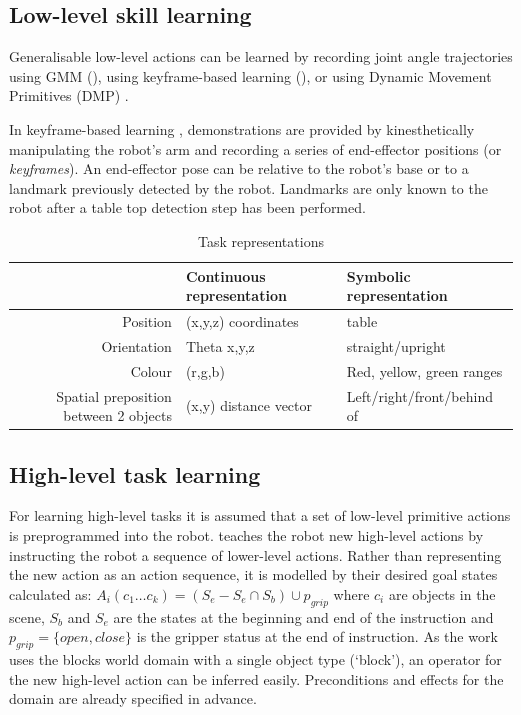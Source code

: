

\subsection{Low-level skill learning}
Generalisable low-level actions can be learned by recording joint angle trajectories using GMM (\cite{billard2008robot}), using keyframe-based learning (\cite{akgun2012keyframe}), or using Dynamic Movement Primitives (DMP) \cite{pastor2009learning}.

In keyframe-based learning \cite{akgun2012keyframe}, demonstrations are provided by kinesthetically manipulating the robot's arm and recording a series of end-effector positions (or \textit{keyframes}). 
An end-effector pose can be relative to the robot's base or to a landmark previously detected by the robot.
Landmarks are only known to the robot after a table top detection step has been performed.

\begin{table}[ht]
\centering
\caption{Task representations}
\label{tab:representations}
\begin{tabular}{r|ll}
 & Continuous representation & Symbolic representation\\ \hline
Position & (x,y,z) coordinates & table \\
Orientation  & Theta x,y,z  & straight/upright \\
Colour & (r,g,b) & Red, yellow, green ranges\\
Spatial preposition between 2 objects & (x,y) distance vector & Left/right/front/behind of 
\end{tabular}
\end{table}

\subsection{High-level task learning}
For learning high-level tasks it is assumed that a set of low-level primitive actions is preprogrammed into the robot. 
\cite{she2014teaching} teaches the robot new high-level actions by instructing the robot a sequence of lower-level actions.
Rather than representing the new action as an action sequence, it is modelled by their desired goal states calculated as:
$A_i(c_1 \dots c_k) = (S_e - S_e \cap S_b) \cup p_{grip}$ where $c_i$ are objects in the scene, $S_b$ and $S_e$ are the states at the beginning and end of the instruction and $p_{grip} = \{open, close\}$ is the gripper status at the end of instruction.
As the work uses the blocks world domain with a single object type (`block'), an operator for the new high-level action can be inferred easily. Preconditions and effects for the domain are already specified in advance.

